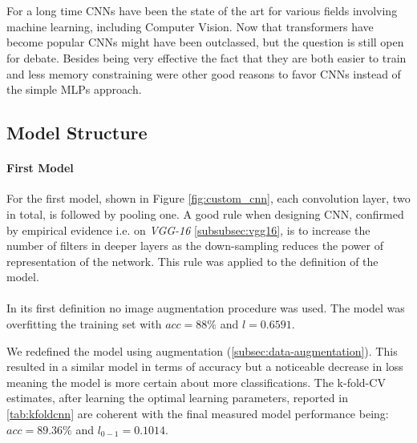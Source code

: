 \\

\paragraph{}
For a long time CNNs have been the state of the art for various fields involving machine learning, including Computer Vision.
Now that transformers have become popular CNNs might have been outclassed, but the question is still open for debate.\cite{wang2023cnns}
Besides being very effective the fact that they are both easier to train and less memory constraining were other good reasons
to favor CNNs instead of the simple MLPs approach.

\subsection{Model Structure}

\paragraph{First Model}
For the first model, shown in Figure \ref{fig:custom_cnn}, each convolution layer, two in total, is followed by pooling one.
A good rule when designing CNN, confirmed by empirical evidence i.e. on \textit{VGG-16} \ref{subsubsec:vgg16},
is to increase the number of filters in deeper layers as the down-sampling reduces the power of representation of the network.
This rule was applied to the definition of the model.

\paragraph{}
In its first definition no image augmentation procedure was used.
The model was overfitting the training set with $acc=88\%$ and $l = 0.6591$.

We redefined the model using augmentation (\ref{subsec:data-augmentation}). This resulted in a similar model
in terms of accuracy but a noticeable decrease in loss meaning the model is more certain about more classifications.
The k-fold-CV estimates, after learning the optimal learning parameters,  reported in \ref{tab:kfoldcnn} are coherent with the final measured model performance being:
$acc=89.36\%$ and $l_{0-1} = 0.1014$. %

